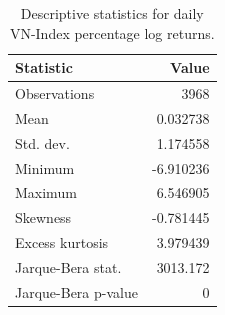 \begin{table}[!t]
\centering
\caption{Descriptive statistics for daily VN-Index percentage log returns.}
\label{tab:return-descriptive-statistics}
\scriptsize
\begin{tabular}{@{}lr@{}}
\toprule
Statistic & Value \\
\midrule
Observations & 3968 \\
Mean & 0.032738 \\
Std. dev. & 1.174558 \\
Minimum & -6.910236 \\
Maximum & 6.546905 \\
Skewness & -0.781445 \\
Excess kurtosis & 3.979439 \\
Jarque-Bera stat. & 3013.172 \\
Jarque-Bera p-value & 0 \\
\bottomrule
\end{tabular}
\end{table}
